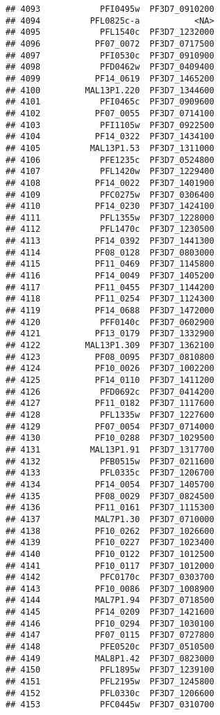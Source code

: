 \documentclass{article}\usepackage[]{graphicx}\usepackage[]{color}
\makeatletter
\newenvironment{kframe}{%
 \def\at@end@of@kframe{}%
 \ifinner\ifhmode%
  \def\at@end@of@kframe{\end{minipage}}%
  \begin{minipage}{\columnwidth}%
 \fi\fi%
 \def\FrameCommand##1{\hskip\@totalleftmargin \hskip-\fboxsep
 \colorbox{shadecolor}{##1}\hskip-\fboxsep
     \hskip-\linewidth \hskip-\@totalleftmargin \hskip\columnwidth}%
 \MakeFramed {\advance\hsize-\width
   \@totalleftmargin\z@ \linewidth\hsize
   \@setminipage}}%
 {\par\unskip\endMakeFramed%
 \at@end@of@kframe}
\newenvironment{knitrout}{}{} %
\makeatother
\begin{document}
\begin{knitrout}
\begin{kframe}
\begin{verbatim}
## 4093            PFI0495w  PF3D7_0910200
## 4094          PFL0825c-a           <NA>
## 4095            PFL1540c  PF3D7_1232000
## 4096           PF07_0072  PF3D7_0717500
## 4097            PFI0530c  PF3D7_0910900
## 4098            PFD0462w  PF3D7_0409400
## 4099           PF14_0619  PF3D7_1465200
## 4100         MAL13P1.220  PF3D7_1344600
## 4101            PFI0465c  PF3D7_0909600
## 4102           PF07_0055  PF3D7_0714100
## 4103            PFI1105w  PF3D7_0922500
## 4104           PF14_0322  PF3D7_1434100
## 4105          MAL13P1.53  PF3D7_1311000
## 4106            PFE1235c  PF3D7_0524800
## 4107            PFL1420w  PF3D7_1229400
## 4108           PF14_0022  PF3D7_1401900
## 4109            PFC0275w  PF3D7_0306400
## 4110           PF14_0230  PF3D7_1424100
## 4111            PFL1355w  PF3D7_1228000
## 4112            PFL1470c  PF3D7_1230500
## 4113           PF14_0392  PF3D7_1441300
## 4114           PF08_0128  PF3D7_0803000
## 4115           PF11_0469  PF3D7_1145800
## 4116           PF14_0049  PF3D7_1405200
## 4117           PF11_0455  PF3D7_1144200
## 4118           PF11_0254  PF3D7_1124300
## 4119           PF14_0688  PF3D7_1472000
## 4120            PFF0140c  PF3D7_0602900
## 4121           PF13_0179  PF3D7_1332900
## 4122         MAL13P1.309  PF3D7_1362100
## 4123           PF08_0095  PF3D7_0810800
## 4124           PF10_0026  PF3D7_1002200
## 4125           PF14_0110  PF3D7_1411200
## 4126            PFD0692c  PF3D7_0414200
## 4127           PF11_0182  PF3D7_1117600
## 4128            PFL1335w  PF3D7_1227600
## 4129           PF07_0054  PF3D7_0714000
## 4130           PF10_0288  PF3D7_1029500
## 4131          MAL13P1.91  PF3D7_1317700
## 4132            PFB0515w  PF3D7_0211600
## 4133            PFL0335c  PF3D7_1206700
## 4134           PF14_0054  PF3D7_1405700
## 4135           PF08_0029  PF3D7_0824500
## 4136           PF11_0161  PF3D7_1115300
## 4137           MAL7P1.30  PF3D7_0710000
## 4138           PF10_0262  PF3D7_1026600
## 4139           PF10_0227  PF3D7_1023400
## 4140           PF10_0122  PF3D7_1012500
## 4141           PF10_0117  PF3D7_1012000
## 4142            PFC0170c  PF3D7_0303700
## 4143           PF10_0086  PF3D7_1008900
## 4144           MAL7P1.94  PF3D7_0718500
## 4145           PF14_0209  PF3D7_1421600
## 4146           PF10_0294  PF3D7_1030100
## 4147           PF07_0115  PF3D7_0727800
## 4148            PFE0520c  PF3D7_0510500
## 4149           MAL8P1.42  PF3D7_0823000
## 4150            PFL1895w  PF3D7_1239100
## 4151            PFL2195w  PF3D7_1245800
## 4152            PFL0330c  PF3D7_1206600
## 4153            PFC0445w  PF3D7_0310700

\end{verbatim}
\end{kframe}
\end{knitrout}
\end{document}
